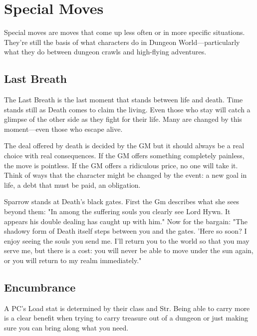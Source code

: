 \chapter{Special Moves}
   
 

Special moves are moves that come up less often or in more specific situations. They're still the basis of what characters do in Dungeon World—particularly what they do between dungeon crawls and high-flying adventures.

 
\section{Last Breath}   
 

The Last Breath is the last moment that stands between life and death. Time stands still as Death comes to claim the living. Even those who stay will catch a glimpse of the other side as they fight for their life. Many are changed by this moment—even those who escape alive.

 

The deal offered by death is decided by the GM but it should always be a real choice with real consequences. If the GM offers something completely painless, the move is pointless. If the GM offers a ridiculous price, no one will take it. Think of ways that the character might be changed by the event: a new goal in life, a debt that must be paid, an obligation.

 
\startExample
Sparrow stands at Death's black gates. First the Gm describes what she sees beyond them: "In among the suffering souls you clearly see Lord Hywn. It appears his double dealing has caught up with him." Now for the bargain: "The shadowy form of Death itself steps between you and the gates. 'Here so soon? I enjoy seeing the souls you send me. I'll return you to the world so that you may serve me, but there is a cost: you will never be able to move under the sun again, or you will return to my realm immediately."
\stopExample
  
\section{Encumbrance}   
 

A PC's Load stat is determined by their class and Str. Being able to carry more is a clear benefit when trying to carry treasure out of a dungeon or just making sure you can bring along what you need.

